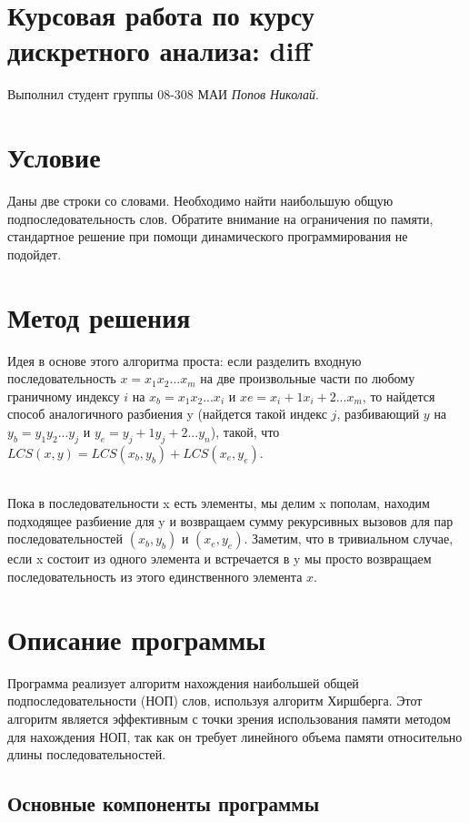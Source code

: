 \documentclass[12pt]{article}
\begin{document}
\section*{Курсовая работа по курсу дискретного анализа: diff}

Выполнил студент группы 08-308 МАИ \textit{Попов Николай}.

\section{Условие}


 Даны две строки со словами. Необходимо найти наибольшую общую подпоследовательность слов. Обратите внимание на ограничения по памяти, стандартное решение при помощи динамического программирования не подойдет.


\section{Метод решения}

Идея в основе этого алгоритма проста: если разделить входную последовательность $x=x_1 x_2 ... x_m$ на две произвольные части по любому граничному индексу $i$ на $x_b=x_1 x_2 ... x_i$ и $xe= x_i+1 x_i+2 ... x_m$, то найдется способ аналогичного разбиения y (найдется такой индекс $j$, разбивающий $y$ на $y_b=y_1 y_2 ... y_j$ и $y_e= y_j+1 y_j+2 ... y_n$), такой, что $LCS(x,y) = LCS(x_b,y_b) + LCS(x_e,y_e)$.  

\\

Пока в последовательности x есть элементы, мы делим x пополам, находим подходящее разбиение для y и возвращаем сумму рекурсивных вызовов для пар последовательностей $(x_b,y_b)$ и $(x_e,y_e)$. Заметим, что в тривиальном случае, если x состоит из одного элемента и встречается в y мы просто возвращаем последовательность из этого единственного элемента $x$.


\section{Описание программы}

Программа реализует алгоритм нахождения наибольшей общей подпоследовательности (НОП) слов, используя алгоритм Хиршберга. Этот алгоритм является эффективным с точки зрения использования памяти методом для нахождения НОП, так как он требует линейного объема памяти относительно длины последовательностей.

\subsection{Основные компоненты программы}
\end{document}
